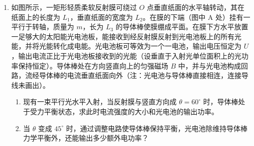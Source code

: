 \documentclass[\gkver]{gaokaozhenti}
\begin{document}
\begin{enumerate}


\item
如图所示，一矩形轻质柔软反射膜可绕过 $O$ 点垂直纸面的水平轴转动，其在纸面上的长度为 $L_{1}$，垂直纸面的宽度为 $L_{2}$。在膜的下端（图中 A 处）挂有一平行于转轴，质量为 $m$，长为 $L_{3}$ 的导体棒使膜绷成平面。在膜下方水平放置一足够大的太阳能光电池板，能接收到经反射膜反射到光电池板上的所有光能，并将光能转化成电能。光电池板可等效为一个一电池，输出电压恒定为 $U$，输出电流正比于光电池板接收到的光能（设垂直于入射光单位面积上的光功率保持恒定）。导体棒处在方向竖直向上的匀强磁场 $B$ 中，并与光电池构成回路，流经导体棒的电流垂直纸面向外（注：光电池与导体棒直接相连，连接导线未画出）。

\begin{enumerate}
	\item
	现有一束平行光水平入射，当反射膜与竖直方向成 $\theta=60^\circ$ 时，导体棒处于受力平衡状态，求此时电流强度的大小和光电池的输出功率。
	\item
	当 $\theta$ 变成 $45^\circ$ 时，通过调整电路使导体棒保持平衡，光电池除维持导体棒力学平衡外，还能输出多少额外电功率？
\end{enumerate}



\end{enumerate}
\end{document}
